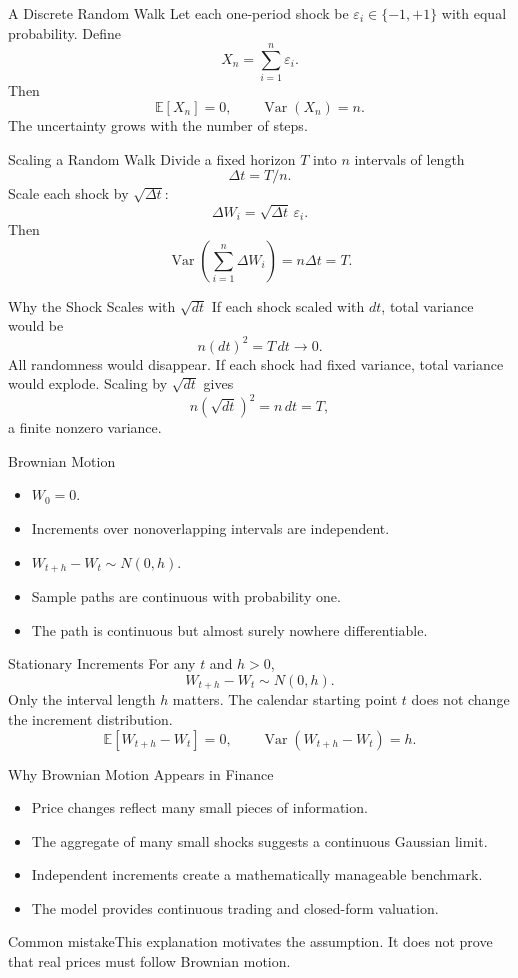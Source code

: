 \documentclass[aspectratio=169]{beamer}
\newcommand{\E}{\mathbb{E}}
\newcommand{\Var}{\operatorname{Var}}
\begin{document}
\begin{frame}[t]{A Discrete Random Walk}
\justifying
Let each one-period shock be $\varepsilon_i\in\{-1,+1\}$ with equal probability. Define
\[X_n=\sum_{i=1}^{n}\varepsilon_i.\]
Then
\[\E[X_n]=0,\qquad \Var(X_n)=n.\]
The uncertainty grows with the number of steps.
\end{frame}

\begin{frame}[t]{Scaling a Random Walk}
\justifying
Divide a fixed horizon $T$ into $n$ intervals of length
\[\Delta t=T/n.\]
Scale each shock by $\sqrt{\Delta t}$:
\[\Delta W_i=\sqrt{\Delta t}\,\varepsilon_i.\]
Then
\[\Var\left(\sum_{i=1}^n\Delta W_i\right)=n\Delta t=T.\]
\end{frame}

\begin{frame}[t]{Why the Shock Scales with $\sqrt{dt}$}
\justifying
If each shock scaled with $dt$, total variance would be
\[n(dt)^2=T\,dt\to0.\]
All randomness would disappear. If each shock had fixed variance, total variance would explode. Scaling by $\sqrt{dt}$ gives
\[n(\sqrt{dt})^2=n\,dt=T,\]
a finite nonzero variance.
\end{frame}

\begin{frame}[t]{Brownian Motion}
\justifying
\begin{itemize}
\item $W_0=0$.
\item Increments over nonoverlapping intervals are independent.
\item $W_{t+h}-W_t\sim N(0,h)$.
\item Sample paths are continuous with probability one.
\item The path is continuous but almost surely nowhere differentiable.
\end{itemize}
\end{frame}

\begin{frame}[t]{Stationary Increments}
\justifying
For any $t$ and $h>0$,
\[W_{t+h}-W_t\sim N(0,h).\]
Only the interval length $h$ matters. The calendar starting point $t$ does not change the increment distribution.
\[\E[W_{t+h}-W_t]=0,\qquad \Var(W_{t+h}-W_t)=h.\]
\end{frame}

\begin{frame}[t]{Why Brownian Motion Appears in Finance}
\justifying
\begin{itemize}
\item Price changes reflect many small pieces of information.
\item The aggregate of many small shocks suggests a continuous Gaussian limit.
\item Independent increments create a mathematically manageable benchmark.
\item The model provides continuous trading and closed-form valuation.
\end{itemize}\begin{alertblock}{Common mistake}This explanation motivates the assumption. It does not prove that real prices must follow Brownian motion.\end{alertblock}
\end{frame}
\end{document}
